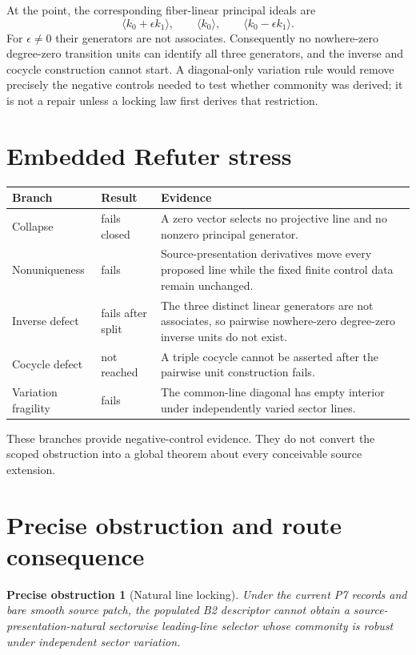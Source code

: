 \documentclass[11pt]{article}
\newtheorem{obstruction}{Precise obstruction}
\begin{document}
At the point, the corresponding fiber-linear principal ideals are
\[
 \langle k_0+\epsilon k_1\rangle,\qquad
 \langle k_0\rangle,\qquad
 \langle k_0-\epsilon k_1\rangle.
\]
For \(\epsilon\ne0\) their generators are not associates.  Consequently no
nowhere-zero degree-zero transition units can identify all three generators,
and the inverse and cocycle construction cannot start.  A diagonal-only
variation rule would remove precisely the negative controls needed to test
whether commonity was derived; it is not a repair unless a locking law first
derives that restriction.

\section{Embedded Refuter stress}

\begin{longtable}{>{\raggedright\arraybackslash}p{}>{\raggedright\arraybackslash}p{}>{\raggedright\arraybackslash}p{}}
\toprule
Branch & Result & Evidence\\
\midrule
Collapse & fails closed & A zero vector selects no projective line and no nonzero principal generator.\\
Nonuniqueness & fails & Source-presentation derivatives move every proposed line while the fixed finite control data remain unchanged.\\
Inverse defect & fails after split & The three distinct linear generators are not associates, so pairwise nowhere-zero degree-zero inverse units do not exist.\\
Cocycle defect & not reached & A triple cocycle cannot be asserted after the pairwise unit construction fails.\\
Variation fragility & fails & The common-line diagonal has empty interior under independently varied sector lines.\\
\bottomrule
\end{longtable}

These branches provide negative-control evidence.  They do not convert the
scoped obstruction into a global theorem about every conceivable source
extension.

\section{Precise obstruction and route consequence}

\begin{obstruction}[Natural line locking]
\label{obst:natural-line}
Under the current P7 records and bare smooth source patch, the populated B2
descriptor cannot obtain a source-presentation-natural sectorwise leading-line
selector whose commonity is robust under independent sector variation.
\end{obstruction}
\end{document}
